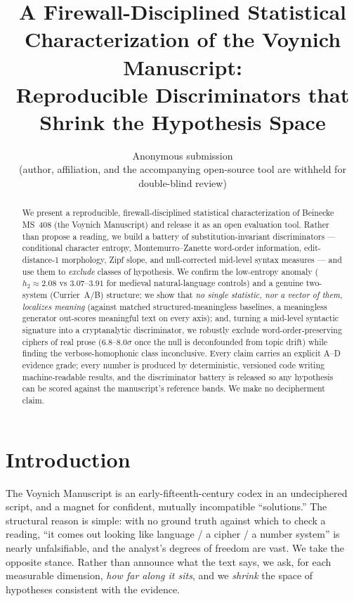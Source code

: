 \documentclass[11pt]{article}
\title{\textbf{A Firewall-Disciplined Statistical Characterization of the Voynich Manuscript:\\
Reproducible Discriminators that Shrink the Hypothesis Space}}
\author{Anonymous submission\\ \small (author, affiliation, and the accompanying open-source
tool are withheld for double-blind review)}
\date{}
\begin{document}
\maketitle

\begin{abstract}
\noindent We present a reproducible, firewall-disciplined statistical characterization of
Beinecke MS~408 (the Voynich Manuscript) and release it as an open evaluation tool. Rather
than propose a reading, we build a battery of substitution-invariant discriminators ---
conditional character entropy, Montemurro--Zanette word-order information, edit-distance-1
morphology, Zipf slope, and null-corrected mid-level syntax measures --- and use them to
\emph{exclude} classes of hypothesis. We confirm the low-entropy anomaly ($h_2\approx 2.08$ vs
$3.07$--$3.91$ for medieval natural-language controls) and a genuine two-system (Currier~A/B)
structure; we show that \emph{no single statistic, nor a vector of them, localizes meaning}
(against matched structured-meaningless baselines, a meaningless generator out-scores
meaningful text on every axis); and, turning a mid-level syntactic signature into a
cryptanalytic discriminator, we robustly exclude word-order-preserving ciphers of real prose
($6.8$--$8.0\sigma$ once the null is deconfounded from topic drift) while finding the
verbose-homophonic class inconclusive. Every claim carries an explicit A--D evidence grade;
every number is produced by deterministic, versioned code writing machine-readable results, and
the discriminator battery is released so any hypothesis can be scored against the manuscript's
reference bands. We make no decipherment claim.
\end{abstract}

\section{Introduction}
The Voynich Manuscript is an early-fifteenth-century codex \citep{dimperio1978elegant} in an
undeciphered script, and a magnet for confident, mutually incompatible ``solutions.'' The
structural reason is simple: with no ground truth against which to check a reading, ``it comes
out looking like language / a cipher / a number system'' is nearly unfalsifiable, and the
analyst's degrees of freedom are vast. We take the opposite stance. Rather than announce what
the text says, we ask, for each measurable dimension, \emph{how far along it sits}, and we
\emph{shrink} the space of hypotheses consistent with the evidence.
\end{document}
